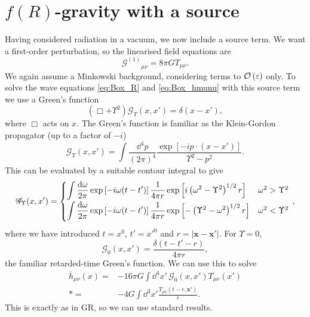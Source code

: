 \section{$f(R)$-gravity with a source}\label{sec:Source}

Having considered radiation in a vacuum, we now include a source term. We want a first-order perturbation, so the linearised field equations are
\begin{equation}
{\mathcal{G}^{(1)}}_{\mu\nu} = 8\pi G T_{\mu\nu}.
\end{equation}
We again assume a Minkowski background, considering terms to $\mathcal{O}\left({\varepsilon}\right)$ only. To solve the wave equations \eqref{eq:Box_R} and \eqref{eq:Box_hmunu} with this source term we use a Green's function
\begin{equation}
\left(\Box + \Upsilon^2\right)\mathscr{G}_\Upsilon(x, x') = \delta(x - x'),
\end{equation}
where $\Box$ acts on $x$. The Green's function is familiar as the Klein-Gordon propagator (up to a factor of $-i$) \citep[section 2.4]{Peskin1995a}
\begin{equation}
\mathscr{G}_\Upsilon(x, x') = \int \frac{\dd^4 p}{(2\pi)^4} \frac{\exp\left[-ip\cdot(x-x')\right]}{\Upsilon^2 - p^2}.
\end{equation}
This can be evaluated by a suitable contour integral to give
\begin{equation}
\mathscr{G}_\Upsilon(x, x') =
\begin{cases}
{\displaystyle \int{\frac{\dd \omega}{2\pi} \exp\left[-i\omega(t-t')\right]\recip{4\pi r}\exp\left[i\left(\omega^2 - \Upsilon^2\right)^{1/2}r\right]}} & \omega^2 > \Upsilon^2\vspace{0.8mm}\\
{\displaystyle \int{\frac{\dd \omega}{2\pi} \exp\left[-i\omega(t-t')\right]\recip{4\pi r}\exp\left[-\left(\Upsilon^2 - \omega^2\right)^{1/2}r\right]}} & \omega^2 < \Upsilon^2\vspace{0.8mm}
\end{cases}\, ,
\label{eq:Green}
\end{equation}
where we have introduced $t = x^0$, $t' = x'^0$ and $r = |\boldsymbol{x} - \boldsymbol{x'}|$. For $\Upsilon = 0$,
\begin{equation}
\mathscr{G}_0(x, x') = \frac{\delta(t - t' - r)}{4 \pi r},
\end{equation}
the familiar retarded-time Green's function. We can use this to solve 
\begin{align}
\overline{h}_{\mu\nu}(x) = {} & -16 \pi G \int \dd^4 x'\, \mathscr{G}_0(x, x') T_{\mu\nu}(x') \nonumber \\*
 = {} & -4 G \int \dd^3 x' \frac{T_{\mu\nu}(t - r, \boldsymbol{x'})}{r}.
\end{align}
This is exactly as in GR, so we can use standard results.

